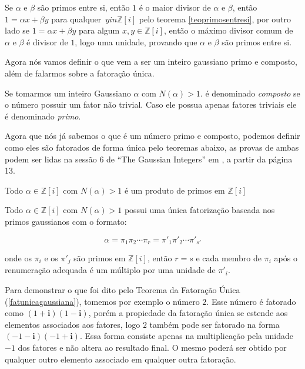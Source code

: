 Se $\alpha$ e $\beta$ s\~ao primos entre si, ent\~ao $1$ \'e o maior divisor de $\alpha$ e $\beta$, ent\~ao $1 = \alpha x + \beta y$ para qualquer $\, y in \mathbb{Z}[i]$  pelo teorema \ref{teoprimosentresi}, por outro lado se $1 = \alpha x + \beta y$ para algum $x, y \in \mathbb{Z}[i]$, ent\~ao o m\'aximo divisor comum de $\alpha$ e $\beta$ \'e divisor de $1$, logo uma unidade, provando que $\alpha$ e $\beta$ s\~ao primos entre si.

\hfill\newline


Agora n\'os vamos definir o que vem a ser um inteiro gaussiano primo e composto, al\'em de falarmos sobre a fatora\c{c}\~ao \'unica.

\begin{Df}
Se tomarmos um inteiro Gaussiano $\alpha$ com $N(\alpha) > 1$. \'e denominado \textit{composto} se o n\'umero possuir um fator n\~ao trivial. Caso ele possua apenas fatores triviais ele \'e denominado \textit{primo}.
\end{Df}

Agora que n\'os j\'a sabemos o que \'e um n\'umero primo e composto, podemos definir como eles s\~ao fatorados de forma \'unica pelo teoremas abaixo, as provas de ambas podem ser lidas na sess\~ao 6 de ``The Gaussian Integers'' em \cite{conrad}, a partir da p\'agina 13.

\begin{Th}
 Todo $\alpha \in \mathbb{Z}[i]$ com $N(\alpha) > 1$ \'e um produto de primos em $\mathbb{Z}[i]$
\end{Th}

\begin{Th} \label{fatunicagaussiana}
 Todo $\alpha \in \mathbb{Z}[i]$ com $N(\alpha) > 1$ possui uma \'unica fatoriza\c{c}\~ao baseada nos primos gaussianos com o formato:

	$$\alpha = \pi_1 \pi_2 \cdots \pi_{r} = \pi'_1 \pi'_2 \cdots \pi'_{s'} $$

onde os $\pi_i$ e os $\pi'_j$ s\~ao primos em $\mathbb{Z}[i]$, ent\~ao $r=s$ e cada membro de $\pi_i$ ap\'os o renumera\c{c}\~ao adequada \'e um m\'ultiplo por uma unidade de $\pi'_i$.

\end{Th}

Para demonstrar o que foi dito pelo Teorema da Fatora\c{c}\~ao \'Unica (\ref{fatunicagaussiana}), tomemos por exemplo o n\'umero $2$. Esse n\'umero \'e fatorado como $(1 + \textbf{i})(1 - \textbf{i})$, por\'em a propiedade da fatora\c{c}\~ao \'unica se estende aos elementos associados aos fatores, logo $2$ tamb\'em pode ser fatorado na forma $(-1 - \textbf{i})(-1 + \textbf{i})$. Essa forma consiste apenas na multiplica\c{c}\~ao pela unidade $-1$ dos fatores e n\~ao altera ao resultado final. O mesmo poder\'a ser obtido por qualquer outro elemento associado em qualquer outra fatora\c{c}\~ao.
